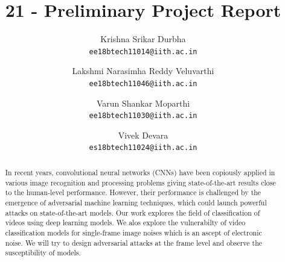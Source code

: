 \documentclass[10pt,twocolumn,letterpaper]{article}
\begin{document}
\title{21  - Preliminary Project Report}

\author{Krishna Srikar Durbha\\
{\tt\small ee18btech11014@iith.ac.in}
\and
Lakshmi Narasimha Reddy Veluvarthi\\
{\tt\small ee18btech11046@iith.ac.in}
\and
Varun Shankar Moparthi\\
{\tt\small ee18btech11030@iith.ac.in}
\and
Vivek Devara\\
{\tt\small es18btech11024@iith.ac.in}
}
\maketitle

\begin{abstract}
In recent years, convolutional neural networks (CNNs) have been copiously applied in various image recognition and processing problems giving state-of-the-art results close to the human-level performance. However, their performance is challenged by the emergence of adversarial machine learning techniques, which could launch powerful attacks on state-of-the-art models. Our work explores the field of classification of videos using deep learning models. We alos explore the vulnerabilty of video classification models for single-frame image noises which is an ascept of electronic noise. We will try to design adversarial attacks at the frame level and observe the susceptibility of models.
\end{abstract}

\end{document}
